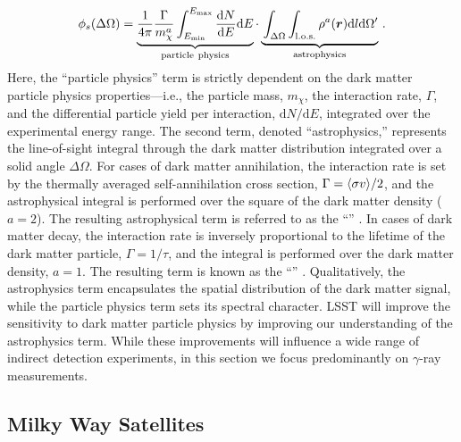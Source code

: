\begin{equation}
   \phi_s(\Delta\Omega) =
    \underbrace{ \frac{1}{4\pi} \frac{\Gamma}{m_{\chi}^{a}}\int^{E_{\max}}_{E_{\min}}\frac{\text{d}N}{\text{d}E}\text{d}E}_{\rm particle\ physics}
    \cdot
    \underbrace{\vphantom{\int_{E_{\min}}} \int_{\Delta\Omega}\int_{\rm l.o.s.}\rho^{a}(\vect{r})\text{d}l\text{d}\Omega '}_{\rm astrophysics}\,.
    \label{eqn:indirect}
\end{equation}
\noindent Here, the ``particle physics'' term is strictly dependent on the dark matter particle physics properties---i.e., the particle mass, $m_\chi$,  the interaction rate, $\Gamma$, and the differential particle yield per interaction, $\text{d}N/\text{d}E$, integrated over the experimental energy range.
The second term, denoted ``astrophysics,'' represents the line-of-sight integral through the dark matter distribution integrated over a solid angle $\Delta\Omega$. 
For cases of dark matter annihilation, the interaction rate is set by the thermally averaged self-annihilation cross section, $\Gamma = \langle \sigma v \rangle/2$, and the astrophysical integral is performed over the square of the dark matter density ($a=2$). 
The resulting astrophysical term is referred to as the ``\Jfactor'' \citep[\eg,][]{1998APh.....9..137B}. 
In cases of dark matter decay, the interaction rate is inversely proportional to the lifetime of the dark matter particle, $\Gamma = 1/\tau$, and the integral is performed over the dark matter density, $a=1$. 
The resulting term is known as the ``\Dfactor'' \citep[\eg][]{1408.0002}.
Qualitatively, the astrophysics term encapsulates the spatial distribution of the dark matter signal, while the particle physics term sets its spectral character. 
LSST will improve the sensitivity to dark matter particle physics by improving our understanding of the astrophysics term.
While these improvements will influence a wide range of indirect detection experiments, in this section we focus predominantly on $\gamma$-ray measurements.


\subsection{Milky Way Satellites }
\label{sec:dwarfs_id}

